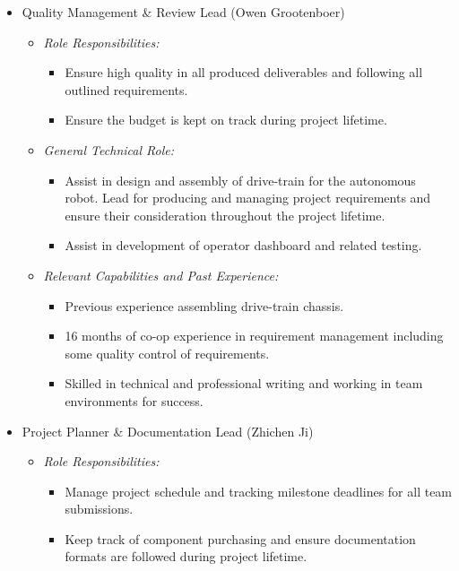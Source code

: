 \documentclass{article}
\begin{document}
\begin{itemize}
\begin{itemize}
    	
    	
    \end{itemize}
    
    \item Quality Management \& Review Lead  (Owen Grootenboer) \label{role:quality_mangement}
    \begin{itemize}
    	\item \textit{Role Responsibilities:}
    	\begin{itemize}
    		\item Ensure high quality in all produced deliverables and following all outlined requirements.
    		\item  Ensure the budget is kept on track during project lifetime. 
    	\end{itemize}
    	
    	\item \textit{General Technical Role:}
    	\begin{itemize}
    		\item Assist in design and assembly of drive-train for the autonomous robot. Lead for producing and managing project requirements and ensure their consideration throughout the project lifetime. 
    		\item Assist in development of operator dashboard and related testing.
    	\end{itemize}
    	
    	\item \textit{Relevant Capabilities and Past Experience:}
    	\begin{itemize}
    		\item Previous experience assembling drive-train chassis. 
    		\item 16 months of co-op experience in requirement management including some quality control of requirements. 
    		\item Skilled in technical and professional writing and working in team environments for success.
    	\end{itemize}	
    	
    	
    	
    \end{itemize}
    
     \item Project Planner \& Documentation Lead  (Zhichen Ji) \label{role:project_planner}
    \begin{itemize}
    	\item \textit{Role Responsibilities:}
    	\begin{itemize}
    		\item Manage project schedule and tracking milestone deadlines for all team submissions. 
    		\item Keep track of component purchasing and ensure documentation formats are followed during project lifetime.
    	\end{itemize}
    	

\end{itemize}
\end{itemize}
\end{document}
